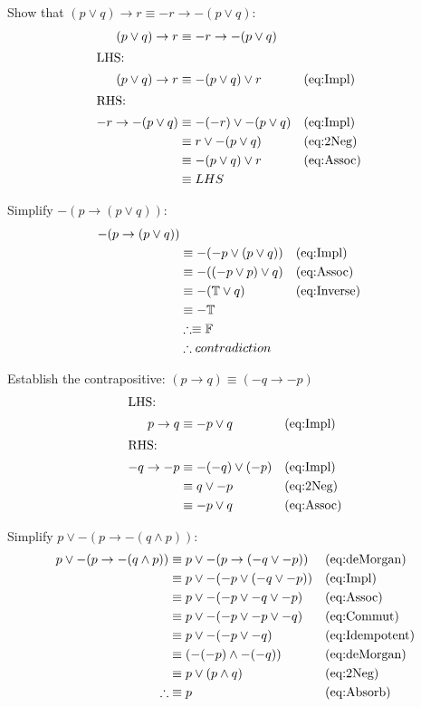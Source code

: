 Show that $(p \lor q) \to r \equiv -r \to -(p \lor q)$:
\begin{align}
  (p \lor q) \to r & \equiv -r \to -(p \lor q) \\
  \intertext{LHS:}
  (p \lor q) \to r & \equiv - (p \lor q) \lor r      && \text{(eq:Impl)}\\
  \intertext{RHS:}
  -r \to -(p \lor q) & \equiv -(-r) \lor -(p \lor q) && \text{(eq:Impl)}\\
    & \equiv r \lor -(p \lor q)                      && \text{(eq:2Neg)}\\
    & \equiv -(p \lor q) \lor r                      && \text{(eq:Assoc)}\\
    & \equiv LHS  
\end{align}

Simplify $ -(p \to (p \lor q)) $:
\begin{align}
  -(p \to (p \lor q)) & \\
  & \equiv -(-p \lor (p \lor q))   && \text{(eq:Impl)}\\
  & \equiv -((-p \lor p) \lor q)   && \text{(eq:Assoc)}\\
  & \equiv -(\mathbb{T} \lor q)    && \text{(eq:Inverse)}\\
  & \equiv -\mathbb{T} && \\
  & \therefore \equiv \mathbb{F} && \\
  & \therefore contradiction
\end{align}

Establish the contrapositive: $ (p \to q ) \equiv (-q \to -p)$
\begin{align}
  \intertext{LHS:}
  p \to q & \equiv -p \lor q         && \text{(eq:Impl)}\\
  \intertext{RHS:}
  -q \to -p & \equiv -(-q) \lor (-p) && \text{(eq:Impl)}\\
            & \equiv q \lor -p       && \text{(eq:2Neg)}\\
            & \equiv -p \lor q       && \text{(eq:Assoc)}
\end{align}

Simplify $p \lor -(p \to -(q \land p))$:
\begin{align}
  p \lor -(p \to -(q \land p)) & \equiv p \lor -(p \to (-q \lor -p))
                                          && \text{(eq:deMorgan)}\\
  & \equiv p \lor -(-p \lor (-q \lor -p)) && \text{(eq:Impl)}\\
  & \equiv p \lor -(-p \lor -q \lor -p )  && \text{(eq:Assoc)}\\
  & \equiv p \lor -(-p \lor -p \lor -q)   && \text{(eq:Commut)}\\
  & \equiv p \lor -(-p \lor -q)           && \text{(eq:Idempotent)}\\
  & \equiv (-(-p) \land -(-q))            && \text{(eq:deMorgan)}\\
  & \equiv p \lor (p \land q)             && \text{(eq:2Neg)}\\
  \therefore & \equiv p                   && \text{(eq:Absorb)}
\end{align}
